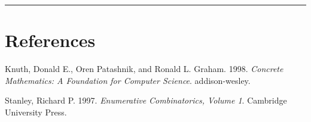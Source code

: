 \documentclass[]{article}
\begin{document}
\begin{center}\rule{0.5\linewidth}{\linethickness}\end{center}

\section*{References}\label{references}

\hypertarget{refs}{}
\hypertarget{ref-concrete}{}
Knuth, Donald E., Oren Patashnik, and Ronald L. Graham. 1998.
\emph{Concrete Mathematics: A Foundation for Computer Science}.
addison-wesley.

\hypertarget{ref-stanley}{}
Stanley, Richard P. 1997. \emph{Enumerative Combinatorics, Volume 1}.
Cambridge University Press.
\end{document}
